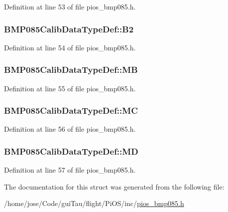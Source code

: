 Definition at line 53 of file pios\-\_\-bmp085.\-h.

\hypertarget{struct_b_m_p085_calib_data_type_def_a895d74abbbe7071148feed73f8217a20}{
\subsubsection[{B2}]{ B\-M\-P085\-Calib\-Data\-Type\-Def\-::\-B2}}\label{struct_b_m_p085_calib_data_type_def_a895d74abbbe7071148feed73f8217a20}


Definition at line 54 of file pios\-\_\-bmp085.\-h.

\hypertarget{struct_b_m_p085_calib_data_type_def_a3e2e7b4e98edcfceeb7af2c622db30e9}{
\subsubsection[{M\-B}]{ B\-M\-P085\-Calib\-Data\-Type\-Def\-::\-M\-B}}\label{struct_b_m_p085_calib_data_type_def_a3e2e7b4e98edcfceeb7af2c622db30e9}


Definition at line 55 of file pios\-\_\-bmp085.\-h.

\hypertarget{struct_b_m_p085_calib_data_type_def_a1665d1134225ff27705293714f8301f6}{
\subsubsection[{M\-C}]{ B\-M\-P085\-Calib\-Data\-Type\-Def\-::\-M\-C}}\label{struct_b_m_p085_calib_data_type_def_a1665d1134225ff27705293714f8301f6}


Definition at line 56 of file pios\-\_\-bmp085.\-h.

\hypertarget{struct_b_m_p085_calib_data_type_def_a8bc67ebe1ea785684147c375ccc9b1be}{
\subsubsection[{M\-D}]{ B\-M\-P085\-Calib\-Data\-Type\-Def\-::\-M\-D}}\label{struct_b_m_p085_calib_data_type_def_a8bc67ebe1ea785684147c375ccc9b1be}


Definition at line 57 of file pios\-\_\-bmp085.\-h.



The documentation for this struct was generated from the following file\-:\begin{DoxyCompactItemize}
\item 
/home/jose/\-Code/gui\-Tau/flight/\-Pi\-O\-S/inc/\hyperlink{pios__bmp085_8h}{pios\-\_\-bmp085.\-h}\end{DoxyCompactItemize}
